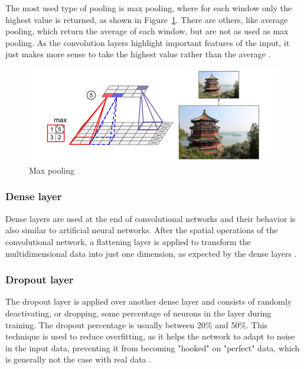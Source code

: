 \documentclass[a4paper,fleqn]{cas-sc}
\begin{document}
The most used type of pooling is max pooling, where for each window only the highest value is returned, as shown in Figure~\ref{fig:pooling}. There are others, like average pooling, which return the average of each window, but are not as used as max pooling. As the convolution layers highlight important features of the input, it just makes more sense to take the highest value rather than the average \cite{chollet2017deep}.

\begin{figure}[h!]
	\caption{Max pooling}
	\label{fig:pooling}
	\centering%
	\begin{minipage}{0.8\textwidth}
		\includegraphics[width=\textwidth]{images/pooling_geron.png}
	\end{minipage}
\end{figure}

\subsubsection{Dense layer}
Dense layers are used at the end of convolutional networks and their behavior is also similar to artificial neural networks. After the spatial operations of the convolutional network, a flattening layer is applied to transform the multidimensional data into just one dimension, as expected by the dense layers \cite{aggarwal2018}.

\subsubsection{Dropout layer}
The dropout layer \cite{hinton2012improving} is applied over another dense layer and consists of randomly deactivating, or dropping, some percentage of neurons in the layer during training. The dropout percentage is usually between 20\% and 50\%. This technique is used to reduce overfitting, as it helps the network to adapt to noise in the input data, preventing it from becoming "hooked" on "perfect" data, which is generally not the case with real data \cite{chollet2017deep}.
\end{document}
